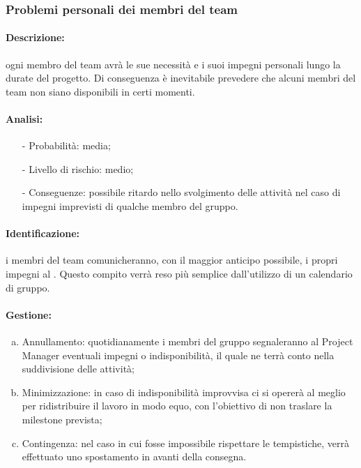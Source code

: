 \documentclass[../PianoProgetto.tex]{subfiles}
\begin{document}
\subsubsection{Problemi personali dei membri del team}

	\paragraph*{Descrizione:} ogni membro del team avrà le sue necessità e i suoi impegni personali lungo la durate del progetto. Di conseguenza è inevitabile prevedere che alcuni membri del team non siano disponibili in certi momenti.
	 
	\paragraph*{Analisi:}
	\begin{itemize}
		\item[-] Probabilità: media;
		\item[-] Livello di rischio: medio;
		\item[-] Conseguenze: possibile ritardo nello svolgimento delle attività nel caso di impegni imprevisti di qualche membro del gruppo.
	\end{itemize}	
		
	\paragraph*{Identificazione:} i membri del team comunicheranno, con il maggior anticipo possibile, i propri impegni al \responsabilediprogetto. Questo compito verrà reso più semplice dall’utilizzo di un calendario di gruppo. 
	
	\paragraph*{Gestione:}
	\begin{enumerate}[(a)]
		\item Annullamento: quotidianamente i membri del gruppo segnaleranno al Project Manager eventuali impegni o indisponibilità, il quale ne terrà conto nella suddivisione delle attività;
		\item Minimizzazione: in caso di indisponibilità improvvisa ci si opererà al meglio per ridistribuire il lavoro in modo equo, con l’obiettivo di non traslare la milestone prevista;
		\item  Contingenza: nel caso in cui fosse impossibile rispettare le tempistiche, verrà effettuato uno spostamento in avanti della consegna.
	\end{enumerate}
			
\end{document}
